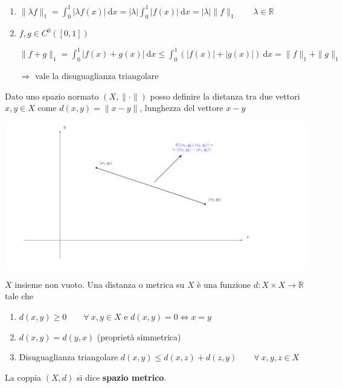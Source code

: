 \begin{exbar}
\begin{example}
\begin{enumerate}
		\item $\parallel \lambda f \parallel_1 = \int_{0}^{1} |\lambda f(x)| \ \mathrm{d}x = |\lambda| \int_{0}^{1} |f(x)| \ \mathrm{d}x = |\lambda| \parallel f \parallel_1 \qquad \lambda \in \mathbb{R}$
		
		\item $f,g \in C^0 ([0,1])$
		
		$\parallel f+g \parallel_1 = \int_{0}^{1} |f(x) + g(x)| \ \mathrm{d}x \leq \int_{0}^{1} (|f(x)| + |g(x)|) \ \mathrm{d}x = \parallel f \parallel_1 + \parallel g \parallel_1$
		
		$\Rightarrow$ vale la disuguaglianza triangolare
	\end{enumerate}
\end{example}
\end{exbar}


\begin{attbar}
	Dato uno spazio normato $(X, \parallel \cdot \parallel)$ posso definire la distanza tra due vettori $x,y \in X$ come $d(x,y)= \parallel x-y \parallel$, lunghezza del vettore $x-y$
	\begin{center}
		\includegraphics[width=0.75\linewidth]{spazi_metrici_e_normati/pag131}
		\label{fig:pag131}
	\end{center}
\end{attbar}


\begin{definition}
	$X$ insieme non vuoto. Una distanza o metrica su $X$ è una funzione $d:X \times X \rightarrow \mathbb{R}$ tale che
	\begin{enumerate}
		\item $d(x,y) \geq 0 \qquad \forall \ x,y \in X $ e $d(x,y) = 0 \iff x = y$
		\item $d(x,y) = d(y,x)$ (proprietà simmetrica)
		\item Disuguaglianza triangolare $d(x,y) \leq d(x,z) + d(z,y) \qquad \forall \ x,y,z \in X$
	\end{enumerate}
	
	La coppia $(X,d)$ si dice \textbf{spazio metrico}.
\end{definition}



